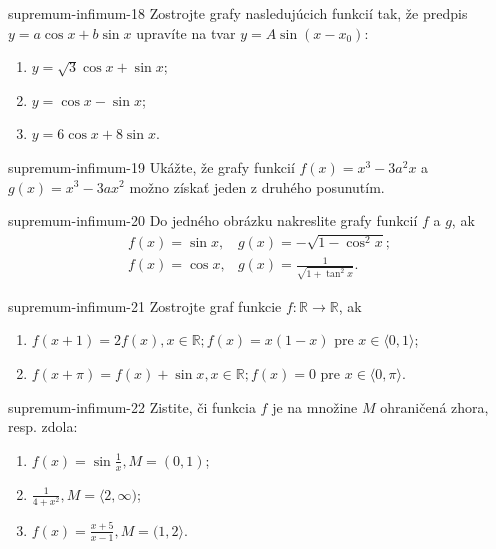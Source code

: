 \begin{defproblem}{supremum-infimum-18}
Zostrojte grafy nasledujúcich funkcií tak, že predpis $y=a\cos x +b\sin x$ upravíte na tvar $y=A\sin (x-x_0)$:
\begin{enumerate}
\item $y=\sqrt{3}\cos x +\sin x$;
\item $y=\cos x -\sin x$;
\item $y=6\cos x +8\sin x$.
\end{enumerate}
\end{defproblem}

\begin{defproblem}{supremum-infimum-19}
Ukážte, že grafy funkcií $f(x)=x^3-3a^2x$ a $g(x)=x^3-3ax^2$ možno získať jeden z druhého posunutím.
\end{defproblem}

\begin{defproblem}{supremum-infimum-20}
Do jedného obrázku nakreslite grafy funkcií $f$ a $g$, ak
\begin{align*}
f(x)=\sin x,& g(x)=-\sqrt{1-\cos^2 x};\\
f(x)=\cos x,& g(x)=\frac{1}{\sqrt{1+\tan^2 x}}.
\end{align*}
\end{defproblem}

\begin{defproblem}{supremum-infimum-21}
Zostrojte graf funkcie $f:\mathbb{R}\rightarrow\mathbb{R}$, ak
\begin{enumerate}
\item $f(x+1)=2f(x),x\in\mathbb{R};f(x)=x(1-x)$ pre $x\in\langle 0,1 \rangle$;\\
\item $f(x+\pi)=f(x)+\sin x,x\in\mathbb{R};f(x)=0$ pre $x\in\langle 0,\pi \rangle$.
\end{enumerate}
\end{defproblem}

\begin{defproblem}{supremum-infimum-22}
Zistite, či funkcia $f$ je na množine $M$ ohraničená zhora, resp. zdola:
\begin{enumerate}
\item $f(x)=\sin\frac{1}{x},M=(0,1)$;
\item $\frac{1}{4+x^2},M=\langle 2,\infty )$;
\item $f(x)=\frac{x+5}{x-1},M=(1,2\rangle$.
\end{enumerate}
\end{defproblem}

